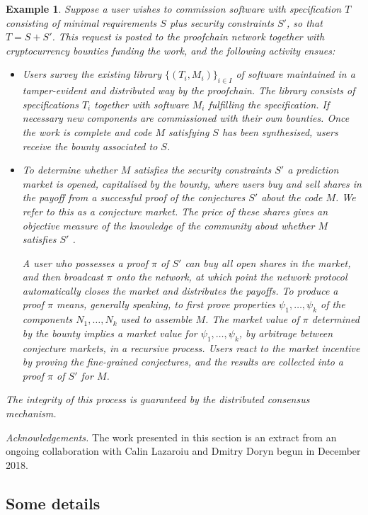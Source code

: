 \documentclass[english,letter paper,12pt,reqno]{article}
\theoremstyle{example}
\newtheorem{example}[theorem]{Example}
\begin{document}
\begin{example}\label{example:proof} Suppose a user wishes to commission software with specification $T$ consisting of minimal requirements $S$ plus security constraints $S'$, so that $T = S + S'$. This request is posted to the proofchain network together with cryptocurrency bounties funding the work, and the following activity ensues:
\begin{itemize}
\item Users survey the existing library $\{ (T_i, M_i) \}_{i \in I}$ of software maintained in a tamper-evident and distributed way by the proofchain. The library consists of specifications $T_i$ together with software $M_i$ fulfilling the specification. If necessary new components are commissioned with their own bounties. Once the work is complete and code $M$ satisfying $S$ has been synthesised, users receive the bounty associated to $S$.

\item To determine whether $M$ satisfies the security constraints $S'$ a prediction market is opened, capitalised by the bounty, where users buy and sell shares in the payoff from a successful proof of the conjectures $S'$ about the code $M$. We refer to this as a \emph{conjecture market}. The price of these shares gives an objective measure of the knowledge of the community about whether $M$ satisfies $S'$ \cite{hanson3}.

A user who possesses a proof $\pi$ of $S'$ can buy all open shares in the market, and then broadcast $\pi$ onto the network, at which point the network protocol automatically closes the market and distributes the payoffs. To produce a proof $\pi$ means, generally speaking, to first prove properties $\psi_1,\ldots,\psi_k$ of the components $N_1,\ldots,N_k$ used to assemble $M$. The market value of $\pi$ determined by the bounty implies a market value for $\psi_1,\ldots,\psi_k$, by arbitrage between conjecture markets, in a recursive process. Users react to the market incentive by proving the fine-grained conjectures, and the results are collected into a proof $\pi$ of $S'$ for $M$.
\end{itemize}
The integrity of this process is guaranteed by the distributed consensus mechanism.
\end{example}

\emph{Acknowledgements.} The work presented in this section is an extract from an ongoing collaboration with Calin Lazaroiu and Dmitry Doryn begun in December 2018.

\subsection{Some details}\label{section:conjecture_markets}
\end{document}
